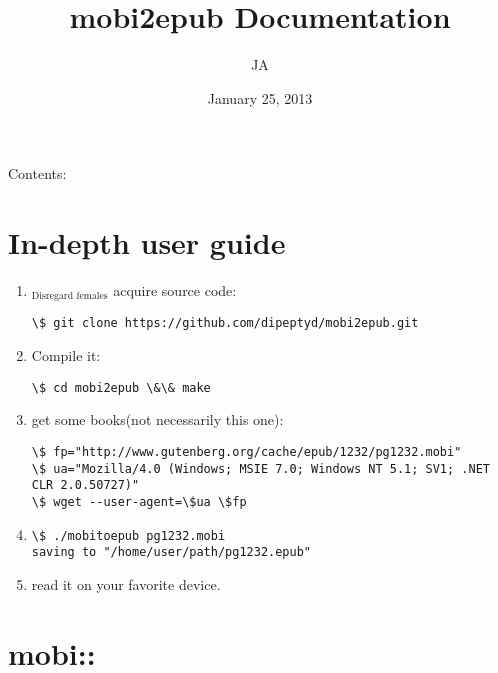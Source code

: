 \documentclass[letterpaper,10pt,english]{sphinxmanual}
\title{mobi2epub Documentation}
\date{January 25, 2013}
\author{JA}
\begin{document}
\maketitle
\tableofcontents
{}\label{index::doc}


Contents:


\chapter{In-depth user guide}
\label{userguide:in-depth-user-guide}\label{userguide::doc}\label{userguide:welcome-to-mobi2epub-s-documentation}\begin{enumerate}
\item {} 
$_{\text{Disregard females}}$ acquire source code:

\begin{Verbatim}[commandchars=\\\{\}]
\$ git clone https://github.com/dipeptyd/mobi2epub.git
\end{Verbatim}

\item {} 
Compile it:

\begin{Verbatim}[commandchars=\\\{\}]
\$ cd mobi2epub \&\& make
\end{Verbatim}

\item {} 
get some books(not necessarily this one):

\begin{Verbatim}[commandchars=\\\{\}]
\$ fp="http://www.gutenberg.org/cache/epub/1232/pg1232.mobi"
\$ ua="Mozilla/4.0 (Windows; MSIE 7.0; Windows NT 5.1; SV1; .NET CLR 2.0.50727)"
\$ wget --user-agent=\$ua \$fp
\end{Verbatim}

\item {} 
\begin{Verbatim}[commandchars=\\\{\}]
\$ ./mobitoepub pg1232.mobi
saving to "/home/user/path/pg1232.epub"
\end{Verbatim}

\item {} 
read it on your favorite device.

\end{enumerate}


\chapter{mobi::}
\label{mobi::doc}\label{mobi:mobi}
\end{document}
